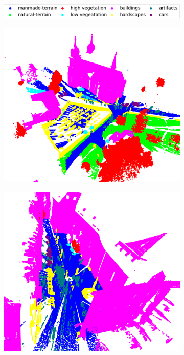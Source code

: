 \begin{figure}[h!]
    \begin{subfigure}{0.9\textwidth}
        \centering
        \includegraphics[scale=0.55]{images/legend.png}    
    \end{subfigure}
    \begin{subfigure}{0.9\textwidth}
        \centering
        \includegraphics[scale=0.3]{images/bildstein_1.png}
        \caption{}    
    \end{subfigure}
    \begin{subfigure}{0.45\textwidth}
        \centering
        \includegraphics[scale=0.28]{images/domfountain_3.png}

\end{subfigure}
\end{figure}
